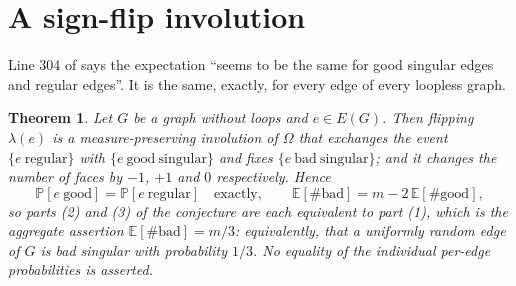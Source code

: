 \documentclass[11pt]{amsart}
\newtheorem{theorem}{Theorem}
\begin{document}
\section{A sign-flip involution}

Line 304 of \cite{GS} says the expectation ``seems to be the same for good
singular edges and regular edges''. It is the same, exactly, for every edge of
every loopless graph.

\begin{theorem}\label{thm:involution}
Let $G$ be a graph without loops and $e\in E(G)$. Then flipping $\lambda(e)$ is
a measure-preserving involution of $\Omega$ that exchanges the event
$\{e\ \mathrm{regular}\}$ with $\{e\ \mathrm{good\ singular}\}$ and fixes
$\{e\ \mathrm{bad\ singular}\}$; and it changes the number of faces by $-1$,
$+1$ and $0$ respectively. Hence
\begin{equation}\label{eq:involution}
 \mathbb{P}[e\ \mathrm{good}]=\mathbb{P}[e\ \mathrm{regular}]
 \quad\text{exactly},\qquad
 \mathbb{E}[\#\mathrm{bad}]=m-2\,\mathbb{E}[\#\mathrm{good}],
\end{equation}
so parts (2) and (3) of the conjecture are each equivalent to part (1), which
is the aggregate assertion $\mathbb{E}[\#\mathrm{bad}]=m/3$: equivalently, that
a uniformly random edge of $G$ is bad singular with probability $1/3$. No
equality of the individual per-edge probabilities is asserted.
\end{theorem}
\end{document}
